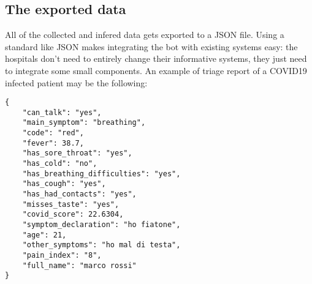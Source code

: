 \documentclass[conference]{IEEEtran}
\begin{document}
\subsection{The exported data}
All of the collected and infered data gets exported to a JSON file. Using a standard like JSON makes integrating the bot with existing systems easy: the hospitals don't need to entirely change their informative systems, they just need to integrate some small components. An example of triage report of a COVID19 infected patient may be the following:
\begin{verbatim}
{
    "can_talk": "yes",
    "main_symptom": "breathing",
    "code": "red",
    "fever": 38.7,
    "has_sore_throat": "yes",
    "has_cold": "no", 
    "has_breathing_difficulties": "yes", 
    "has_cough": "yes",
    "has_had_contacts": "yes",
    "misses_taste": "yes",
    "covid_score": 22.6304,
    "symptom_declaration": "ho fiatone",
    "age": 21,
    "other_symptoms": "ho mal di testa", 
    "pain_index": "8",
    "full_name": "marco rossi"
}
\end{verbatim}
\end{document}
